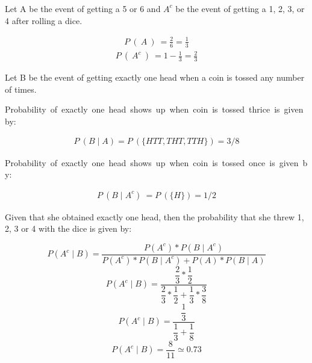 \documentclass[journal,12pt,twocolumn]{IEEEtran}
\begin{document}
\subsection*{}\\
\begin{flushleft}
Let A be the event of getting a 5 or 6 and \newline $A^c$ be the event of getting a 1, 2, 3, or 4 after rolling a dice.
\end{flushleft}
\begin{align}
P\ (\ A\ )\ = \frac{2}{6} = \frac{1}{3}
\end{align}
\begin{align}
P\ (\ A^c\ )\ = 1 - \frac{1}{3} = \frac{2}{3}
\end{align}
\begin{flushleft}
Let B be the event of getting exactly one head when a coin is tossed any number of times.
\end{flushleft}
\begin{flushleft} Probability\ of\ exactly\ one\ head\ shows\ up\ when\ coin\ is\ tossed\ thrice\ is\ given\ by:\end{flushleft}
\begin{align}P\ (B\;|\;A) = P\ (\{ HTT, THT, TTH \}) = 3/8\end{align}
\newline
\begin{flushleft} Probability\ of\ exactly\ one\ head\ shows\ up\ when\ coin\ is\ tossed\ once\ is\ given\ by:\end{flushleft}
\begin{align}
P\ (B \;|\;A^c)\ = P\ (\{ H \}) = 1/2
\end{align}
\begin{flushleft}
Given that she obtained exactly one
head, then the probability that she threw 1,
2, 3 or 4 with the dice is given by:
\end{flushleft}
\begin{equation}
P(A^c\;|\;B)=\dfrac{P(A^c)*P(B\;|\;A^c)}{P(A^c)*P(B\;|\;A^c) + P(A)*P(B\;|\;A)}     
\end{equation}
\begin{equation}
P(A^c\;|\;B)=\dfrac{\dfrac{2}{3}*\dfrac{1}{2}}{\dfrac{2}{3}*\dfrac{1}{2} + \dfrac{1}{3}*\dfrac{3}{8}}     
\end{equation}
\begin{equation}
P(A^c\;|\;B)=\dfrac{\dfrac{1}{3}}{\dfrac{1}{3} + \dfrac{1}{8}}     
\end{equation}
\begin{equation}
P(A^c\;|\;B)=\dfrac{8}{11} \simeq 0.73    
\end{equation}
\end{document}
